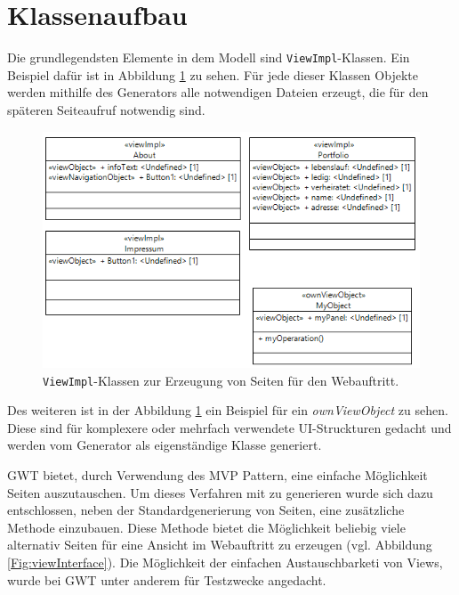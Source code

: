 \newpage
\section{Klassenaufbau}
Die grundlegendsten Elemente in dem Modell sind \texttt{ViewImpl}-Klassen. Ein
Beispiel dafür ist in Abbildung \ref{Fig:viewimpl} zu sehen. Für jede dieser
Klassen Objekte werden mithilfe des Generators alle notwendigen Dateien
erzeugt, die für den späteren Seiteaufruf notwendig sind.

\begin{figure}[htbp]
\begin{center}
\includegraphics[width=1.0\textwidth]{./img/GWT-Model-Views-alg.png}
\caption{\texttt{ViewImpl}-Klassen zur Erzeugung von Seiten
für den Webauftritt.}\label{Fig:viewimpl}
\end{center}
\end{figure}

Des weiteren ist in der Abbildung \ref{Fig:viewimpl} ein Beispiel für ein
\textit{ownViewObject} zu sehen. Diese sind für komplexere oder mehrfach
verwendete UI-Struckturen gedacht und werden vom Generator als eigenständige
Klasse generiert.

GWT bietet, durch Verwendung des MVP Pattern, eine einfache Möglichkeit Seiten
auszutauschen. Um dieses Verfahren mit zu generieren wurde sich dazu
entschlossen, neben der Standardgenerierung von Seiten, eine zusätzliche
Methode einzubauen. Diese Methode bietet die Möglichkeit beliebig viele
alternativ Seiten für eine Ansicht im Webauftritt zu erzeugen (vgl. Abbildung
\ref{Fig:viewInterface}). Die Möglichkeit der einfachen Austauschbarketi von
Views, wurde bei GWT unter anderem für Testzwecke angedacht.

